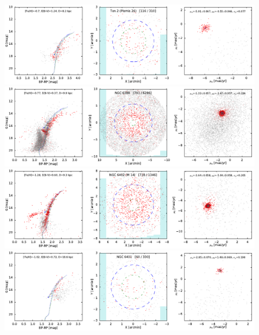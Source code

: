 \documentclass[usenatbib]{mnras}
\begin{document}
\clearpage\begin{figure}
\contcaption{}
\includegraphics{figs/Ton2_Pismis26.pdf}
\includegraphics{figs/NGC_6388.pdf}
\includegraphics{figs/NGC_6402_M_14.pdf}
\includegraphics{figs/NGC_6401.pdf}
\end{figure}
\end{document}
